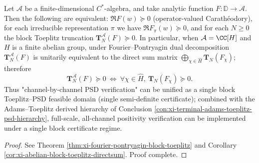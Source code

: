 \begin{conclusion}\label{con:xi-terminal-abelian-block-toeplitz-diagonalization}
Let \(\mathcal{A}\) be a finite-dimensional \(C^\ast\)-algebra, and take analytic function \(F:\mathbb{D}\to\mathcal{A}\).
Then the following are equivalent: \(\Re F(w)\succeq 0\) (operator-valued Carathéodory), for each irreducible representation \(\pi\) we have \(\Re F_\pi(w)\succeq 0\), and for each \(N\ge 0\) the block Toeplitz truncation \(\mathbf{T}^{\mathcal{A}}_N(F)\succeq 0\).
In particular, when \(\mathcal{A}=\CC[H]\) and \(H\) is a finite abelian group, under Fourier--Pontryagin dual decomposition \(\mathbf{T}^{\mathcal{A}}_N(F)\) is unitarily equivalent to the direct sum matrix \(\bigoplus_{\chi\in\widehat H}\mathbf{T}_N(F_\chi)\); therefore
\[
\mathbf{T}^{\mathcal{A}}_N(F)\succeq 0\ \Longleftrightarrow\ \forall\chi\in\widehat H,\ \mathbf{T}_N(F_\chi)\succeq 0.
\]
Thus "channel-by-channel PSD verification" can be unified as a single block Toeplitz--PSD feasible domain (single semi-definite certificate); combined with the Adams--Toeplitz derived hierarchy of Conclusion \ref{con:xi-terminal-adams-toeplitz-psd-hierarchy}, full-scale, all-channel positivity verification can be implemented under a single block certificate regime.
\end{conclusion}
\begin{proof}[Proof]
See Theorem \ref{thm:xi-fourier-pontryagin-block-toeplitz} and Corollary \ref{cor:xi-abelian-block-toeplitz-directsum}. Proof complete.
\end{proof}

